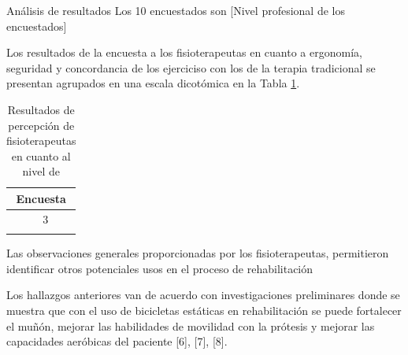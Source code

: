 \begin{thesischapter}{3} {Análisis de resultados}
    \newpage 
    Los 10 encuestados son [Nivel profesional de los encuestados]

    Los resultados de la encuesta a los fisioterapeutas en cuanto a ergonomía, seguridad y concordancia 
    de los ejerciciso con los de la terapia tradicional se presentan agrupados en una escala dicotómica
    en la Tabla \ref{table:test}.
    
\vspace{10pt}
\begin{table}[ht]
    \centering
    \begin{tabular}{ |p{3cm}||p{3cm}|p{3cm}|p{3cm}|  }
        \hline
        \multicolumn{4}{|c|}{Encuesta} \\
        \hline
        &     &  3 &  \\
        \hline
         &     &    &\\
        \hline        
    \end{tabular}
    \label{table:test}

    \caption{Resultados de percepción de fisioterapeutas en cuanto al nivel de}
\end{table}

    \vspace{10pt}
    Las observaciones generales proporcionadas por los fisioterapeutas, permitieron identificar otros 
    potenciales usos en el proceso de rehabilitación


    \vspace{10pt}
    Los hallazgos anteriores van de acuerdo con investigaciones preliminares donde se muestra que con el uso de bicicletas estáticas
    en rehabilitación se puede fortalecer el muñón, mejorar las habilidades de movilidad con la prótesis y mejorar las capacidades 
    aeróbicas del paciente [6], [7], [8].


\end{thesischapter}
